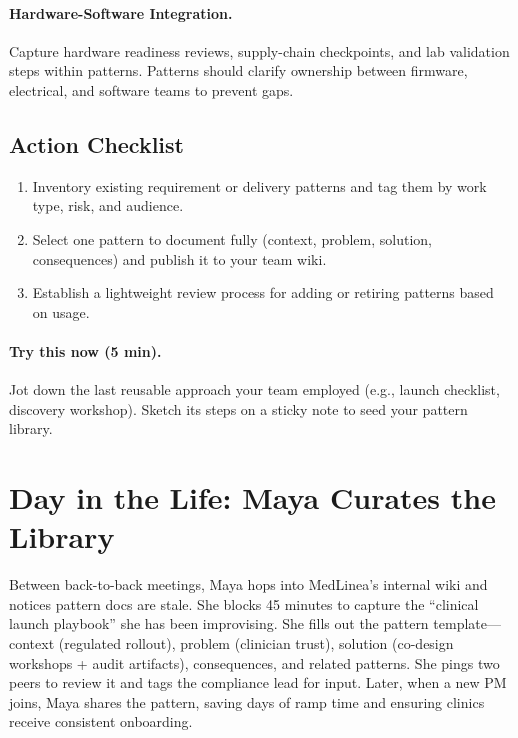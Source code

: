 \paragraph{Hardware-Software Integration.} Capture hardware readiness reviews, supply-chain checkpoints, and lab validation steps within patterns. Patterns should clarify ownership between firmware, electrical, and software teams to prevent gaps.

\subsection{Action Checklist}
\begin{enumerate}
    \item Inventory existing requirement or delivery patterns and tag them by work type, risk, and audience.
    \item Select one pattern to document fully (context, problem, solution, consequences) and publish it to your team wiki.
    \item Establish a lightweight review process for adding or retiring patterns based on usage.
\end{enumerate}

\paragraph{Try this now (5 min).} Jot down the last reusable approach your team employed (e.g., launch checklist, discovery workshop). Sketch its steps on a sticky note to seed your pattern library.

\section{Day in the Life: Maya Curates the Library}
Between back-to-back meetings, Maya hops into MedLinea’s internal wiki and notices pattern docs are stale. She blocks 45 minutes to capture the ``clinical launch playbook'' she has been improvising. She fills out the pattern template—context (regulated rollout), problem (clinician trust), solution (co-design workshops + audit artifacts), consequences, and related patterns. She pings two peers to review it and tags the compliance lead for input. Later, when a new PM joins, Maya shares the pattern, saving days of ramp time and ensuring clinics receive consistent onboarding.
